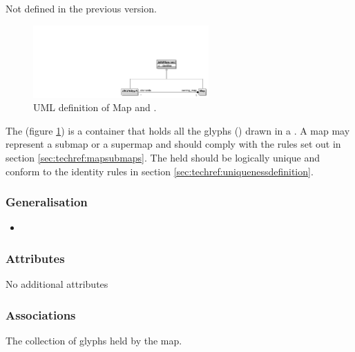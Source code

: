 Not defined in the previous version.

\label{defn:Map}\label{sec:techref:map}


\begin{figure}[htb]
  \centering
  \includegraphics[width=0.6\textwidth]{images/mapuml}
  \caption{UML definition of Map and .}
  \label{fig:techref:mapuml}
\end{figure}

The  (figure \ref{fig:techref:mapuml}) is a container that
holds all the glyphs () drawn in a \PDm. A map may
represent a submap or a supermap and should comply with the rules set
out in section \ref{sec:techref:mapsubmaps}. The  held should be
logically unique and conform to the identity rules in section
\ref{sec:techref:uniquenessdefinition}.


\subsubsection{Generalisation}

\begin{itemize}
\item {}
\end{itemize}

\subsubsection{Attributes}

No additional attributes

\subsubsection{Associations}

\begin{attributes}
 The collection of glyphs held by the map.
\end{attributes}

